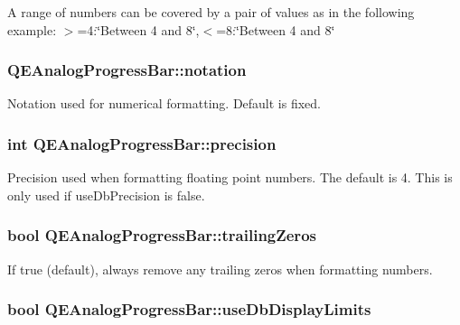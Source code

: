 A range of numbers can be covered by a pair of values as in the following example: $>$=4:\char`\"{}Between 4 and 8\char`\"{},$<$=8:\char`\"{}Between 4 and 8\char`\"{} \hypertarget{classQEAnalogProgressBar_a906ed8eeec5db7c83068194aac8a7b43}{
\subsubsection[{notation}]{ QEAnalogProgressBar::notation}}
\label{classQEAnalogProgressBar_a906ed8eeec5db7c83068194aac8a7b43}
Notation used for numerical formatting. Default is fixed. \hypertarget{classQEAnalogProgressBar_a6e6f5d1f444a353fd7425d831d27069d}{
\subsubsection[{precision}]{\setlength{\rightskip}{0pt plus 5cm}int QEAnalogProgressBar::precision}}
\label{classQEAnalogProgressBar_a6e6f5d1f444a353fd7425d831d27069d}
Precision used when formatting floating point numbers. The default is 4. This is only used if useDbPrecision is false. \hypertarget{classQEAnalogProgressBar_a9ab279b6217cefbd76c2299e09d68244}{
\subsubsection[{trailingZeros}]{\setlength{\rightskip}{0pt plus 5cm}bool QEAnalogProgressBar::trailingZeros}}
\label{classQEAnalogProgressBar_a9ab279b6217cefbd76c2299e09d68244}
If true (default), always remove any trailing zeros when formatting numbers. \hypertarget{classQEAnalogProgressBar_a5ce12a78667eafebc8c9d7f9924acbf7}{
\subsubsection[{useDbDisplayLimits}]{\setlength{\rightskip}{0pt plus 5cm}bool QEAnalogProgressBar::useDbDisplayLimits}}
